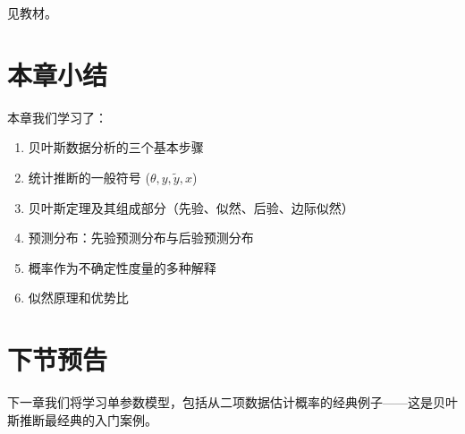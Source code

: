 见教材。

\section{本章小结}

本章我们学习了：
\begin{enumerate}
  \item 贝叶斯数据分析的三个基本步骤
  \item 统计推断的一般符号 ($\theta, y, \tilde{y}, x$)
  \item 贝叶斯定理及其组成部分（先验、似然、后验、边际似然）
  \item 预测分布：先验预测分布与后验预测分布
  \item 概率作为不确定性度量的多种解释
  \item 似然原理和优势比
\end{enumerate}

\section{下节预告}

下一章我们将学习单参数模型，包括从二项数据估计概率的经典例子——这是贝叶斯推断最经典的入门案例。

\endinput
